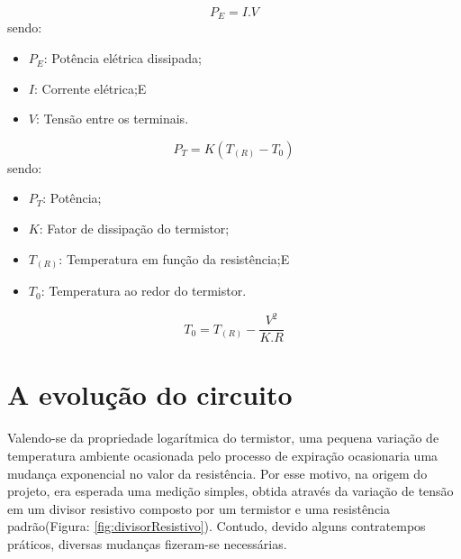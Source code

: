 		\begin{equation}\label{eq:potenciaeletrica}
			P_E = I.V
		\end{equation}
		sendo:
		\begin{itemize}
			\item $P_E$: Potência elétrica dissipada;
			\item $I$: Corrente elétrica;E
			\item $V$: Tensão entre os terminais.
		\end{itemize}

		\begin{equation}\label{eq:potenciatermica}
			P_T = K(T_{(R)} - T_0)
		\end{equation}
		sendo:
		\begin{itemize}
			\item $P_T$: Potência;
			\item $K$: Fator de dissipação do termistor;
			\item $T_{(R)}$: Temperatura em função da resistência;E
			\item $T_0$: Temperatura ao redor do termistor.
		\end{itemize}
		
		\begin{equation} \label{eq:temperaturacomautoaquecimento}
			T_0 = T_{(R)} - \dfrac{V^2}{K.R}
		\end{equation}
		

\section{A evolução do circuito}
 
Valendo-se da propriedade logarítmica do termistor, uma pequena variação de temperatura ambiente ocasionada pelo processo de expiração ocasionaria uma mudança exponencial no valor da resistência. Por esse motivo, na origem do projeto, era esperada uma medição simples, obtida através da variação de tensão em um divisor resistivo composto por um termistor e uma resistência padrão(Figura: \ref{fig:divisorResistivo}). Contudo, devido alguns contratempos práticos, diversas mudanças fizeram-se necessárias. 
 

